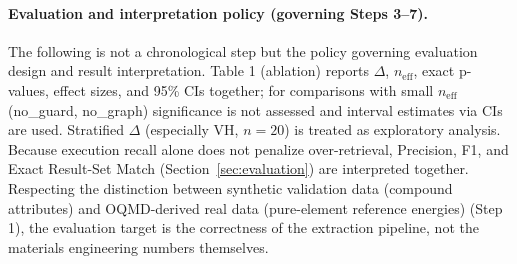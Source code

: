\paragraph{Evaluation and interpretation policy (governing Steps 3--7).}
The following is not a chronological step but the policy governing evaluation design and result interpretation. Table 1 (ablation) reports $\Delta$, $n_\mathrm{eff}$, exact p-values, effect sizes, and 95\% CIs together; for comparisons with small $n_\mathrm{eff}$ (no\_guard, no\_graph) significance is not assessed and interval estimates via CIs are used. Stratified $\Delta$ (especially VH, $n=20$) is treated as exploratory analysis. Because execution recall alone does not penalize over-retrieval, Precision, F1, and Exact Result-Set Match (Section~\ref{sec:evaluation}) are interpreted together. Respecting the distinction between synthetic validation data (compound attributes) and OQMD-derived real data (pure-element reference energies) (Step 1), the evaluation target is the correctness of the extraction pipeline, not the materials engineering numbers themselves.


